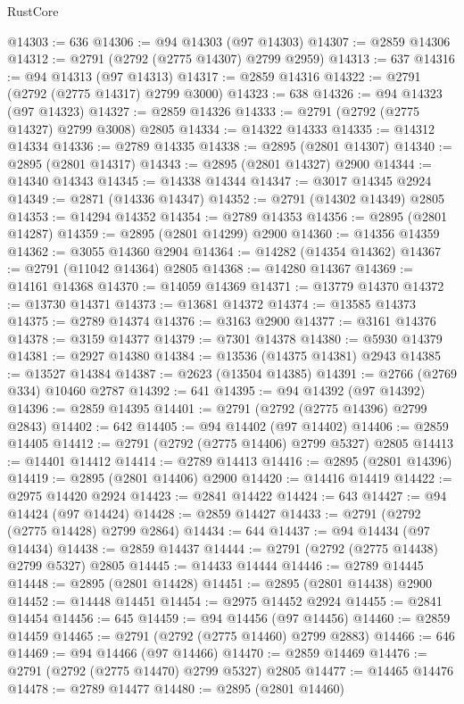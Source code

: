 \begin{lexlean}{RustCore}
\begin{coremodule}
@14303 := 636
@14306 := @94 @14303 (@97 @14303)
@14307 := @2859 @14306
@14312 := @2791 (@2792 (@2775 @14307) @2799 @2959)
@14313 := 637
@14316 := @94 @14313 (@97 @14313)
@14317 := @2859 @14316
@14322 := @2791 (@2792 (@2775 @14317) @2799 @3000)
@14323 := 638
@14326 := @94 @14323 (@97 @14323)
@14327 := @2859 @14326
@14333 := @2791 (@2792 (@2775 @14327) @2799 @3008) @2805
@14334 := @14322 @14333
@14335 := @14312 @14334
@14336 := @2789 @14335
@14338 := @2895 (@2801 @14307)
@14340 := @2895 (@2801 @14317)
@14343 := @2895 (@2801 @14327) @2900
@14344 := @14340 @14343
@14345 := @14338 @14344
@14347 := @3017 @14345 @2924
@14349 := @2871 (@14336 @14347)
@14352 := @2791 (@14302 @14349) @2805
@14353 := @14294 @14352
@14354 := @2789 @14353
@14356 := @2895 (@2801 @14287)
@14359 := @2895 (@2801 @14299) @2900
@14360 := @14356 @14359
@14362 := @3055 @14360 @2904
@14364 := @14282 (@14354 @14362)
@14367 := @2791 (@11042 @14364) @2805
@14368 := @14280 @14367
@14369 := @14161 @14368
@14370 := @14059 @14369
@14371 := @13779 @14370
@14372 := @13730 @14371
@14373 := @13681 @14372
@14374 := @13585 @14373
@14375 := @2789 @14374
@14376 := @3163 @2900
@14377 := @3161 @14376
@14378 := @3159 @14377
@14379 := @7301 @14378
@14380 := @5930 @14379
@14381 := @2927 @14380
@14384 := @13536 (@14375 @14381) @2943
@14385 := @13527 @14384
@14387 := @2623 (@13504 @14385)
@14391 := @2766 (@2769 @334) @10460 @2787
@14392 := 641
@14395 := @94 @14392 (@97 @14392)
@14396 := @2859 @14395
@14401 := @2791 (@2792 (@2775 @14396) @2799 @2843)
@14402 := 642
@14405 := @94 @14402 (@97 @14402)
@14406 := @2859 @14405
@14412 := @2791 (@2792 (@2775 @14406) @2799 @5327) @2805
@14413 := @14401 @14412
@14414 := @2789 @14413
@14416 := @2895 (@2801 @14396)
@14419 := @2895 (@2801 @14406) @2900
@14420 := @14416 @14419
@14422 := @2975 @14420 @2924
@14423 := @2841 @14422
@14424 := 643
@14427 := @94 @14424 (@97 @14424)
@14428 := @2859 @14427
@14433 := @2791 (@2792 (@2775 @14428) @2799 @2864)
@14434 := 644
@14437 := @94 @14434 (@97 @14434)
@14438 := @2859 @14437
@14444 := @2791 (@2792 (@2775 @14438) @2799 @5327) @2805
@14445 := @14433 @14444
@14446 := @2789 @14445
@14448 := @2895 (@2801 @14428)
@14451 := @2895 (@2801 @14438) @2900
@14452 := @14448 @14451
@14454 := @2975 @14452 @2924
@14455 := @2841 @14454
@14456 := 645
@14459 := @94 @14456 (@97 @14456)
@14460 := @2859 @14459
@14465 := @2791 (@2792 (@2775 @14460) @2799 @2883)
@14466 := 646
@14469 := @94 @14466 (@97 @14466)
@14470 := @2859 @14469
@14476 := @2791 (@2792 (@2775 @14470) @2799 @5327) @2805
@14477 := @14465 @14476
@14478 := @2789 @14477
@14480 := @2895 (@2801 @14460)

\end{coremodule}
\end{lexlean}
